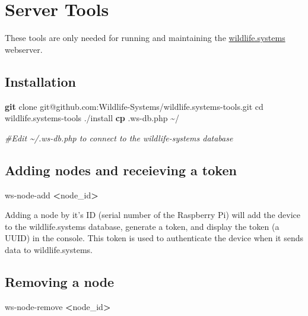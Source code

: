 \documentclass[
]{book}
\newenvironment{Shaded}{\begin{snugshade}}{\end{snugshade}}
\newcommand{\BuiltInTok}[1]{#1}
\newcommand{\CommentTok}[1]{\textcolor[rgb]{0.56,0.35,0.01}{\textit{#1}}}
\newcommand{\ExtensionTok}[1]{#1}
\newcommand{\FunctionTok}[1]{\textcolor[rgb]{0.13,0.29,0.53}{\textbf{#1}}}
\newcommand{\NormalTok}[1]{#1}
\newcommand{\OperatorTok}[1]{\textcolor[rgb]{0.81,0.36,0.00}{\textbf{#1}}}
\begin{document}
\chapter{Server Tools}\label{server-tools}

These tools are only needed for running and maintaining the \href{https://wildlife.systems}{wildlife.systems} webserver.

\section{Installation}\label{installation-1}

\begin{Shaded}
\begin{Highlighting}[]
\FunctionTok{git}\NormalTok{ clone git@github.com:Wildlife{-}Systems/wildlife.systems{-}tools.git}
\BuiltInTok{cd}\NormalTok{ wildlife.systems{-}tools}
\ExtensionTok{./install}
\FunctionTok{cp}\NormalTok{ .ws{-}db.php \textasciitilde{}/}

\CommentTok{\#Edit \textasciitilde{}/.ws{-}db.php to connect to the wildlife{-}systems database}
\end{Highlighting}
\end{Shaded}

\section{Adding nodes and receieving a token}\label{adding-nodes-and-receieving-a-token}

\begin{Shaded}
\begin{Highlighting}[]
\ExtensionTok{ws{-}node{-}add} \OperatorTok{\textless{}}\NormalTok{node\_id}\OperatorTok{\textgreater{}}
\end{Highlighting}
\end{Shaded}

Adding a node by it's ID (serial number of the Raspberry Pi) will add the device to the wildlife.systems database, generate a token, and display the token (a UUID) in the console. This token is used to authenticate the device when it sends data to wildlife.systems.

\section{Removing a node}\label{removing-a-node}

\begin{Shaded}
\begin{Highlighting}[]
\ExtensionTok{ws{-}node{-}remove} \OperatorTok{\textless{}}\NormalTok{node\_id}\OperatorTok{\textgreater{}}
\end{Highlighting}
\end{Shaded}
\end{document}
